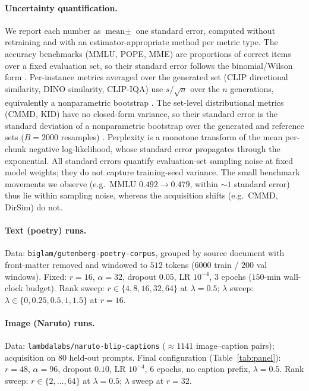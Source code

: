 \documentclass{article}
\begin{document}
\paragraph{Uncertainty quantification.}
We report each number as $\text{mean}\pm$ one standard error, computed without
retraining and with an estimator-appropriate method per metric type. The accuracy
benchmarks (MMLU, POPE, MME) are proportions of correct items over a fixed
evaluation set, so their standard error follows the binomial/Wilson form
\citep{wilson1927,brown2001interval}. Per-instance metrics averaged over the
generated set (CLIP directional similarity, DINO similarity, CLIP-IQA) use
$s/\sqrt{n}$ over the $n$ generations, equivalently a nonparametric bootstrap
\citep{efron1993bootstrap}. The set-level distributional metrics (CMMD, KID) have
no closed-form variance, so their standard error is the standard deviation of a
nonparametric bootstrap over the generated and reference sets ($B{=}2000$
resamples) \citep{efron1993bootstrap,binkowski2018demystifying}. Perplexity is a
monotone transform of the mean per-chunk negative log-likelihood, whose standard
error propagates through the exponential. All standard errors quantify
evaluation-set sampling noise at fixed model weights; they do not capture
training-seed variance. The small benchmark movements we observe (e.g.\ MMLU
$0.492\!\to\!0.479$, within $\sim\!1$ standard error) thus lie within sampling
noise, whereas the acquisition shifts (e.g.\ CMMD, DirSim) do not.

\paragraph{Text (poetry) runs.}
Data: \texttt{biglam/gutenberg-poetry-corpus}, grouped by source document with
front-matter removed and windowed to $512$ tokens ($6000$ train / $200$ val
windows). Fixed: $r{=}16$, $\alpha{=}32$, dropout $0.05$, LR $10^{-4}$, $3$
epochs ($150$-min wall-clock budget). Rank sweep: $r\in\{4,8,16,32,64\}$ at
$\lambda{=}0.5$; $\lambda$ sweep: $\lambda\in\{0,0.25,0.5,1,1.5\}$ at $r{=}16$.

\paragraph{Image (Naruto) runs.}
Data: \texttt{lambdalabs/naruto-blip-captions} ($\approx$$1141$ image--caption
pairs); acquisition on $80$ held-out prompts. Final configuration
(Table~\ref{tab:panel}): $r{=}48$, $\alpha{=}96$, dropout $0.10$, LR $10^{-4}$,
$6$ epochs, no caption prefix, $\lambda{=}0.5$. Rank sweep:
$r\in\{2,\dots,64\}$ at $\lambda{=}0.5$; $\lambda$ sweep at $r{=}32$.
\end{document}

